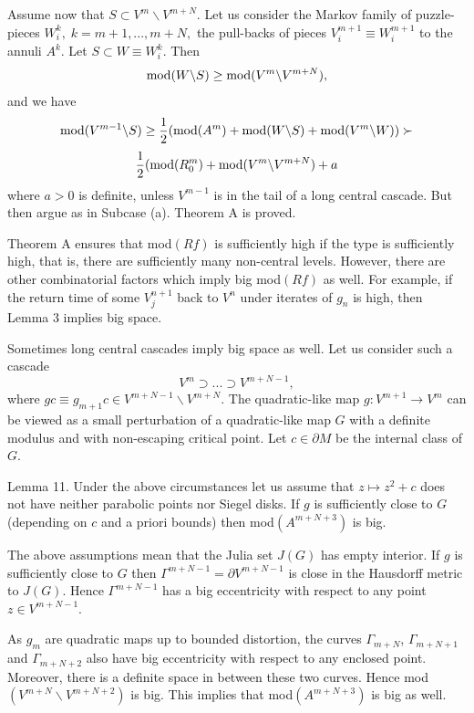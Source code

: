   Assume now that
   $S\subset V^m\backslash V^{m+N}.$  Let us consider the
  Markov family of puzzle-pieces $W^k_i,\; k=m+1,...,m+N,$ the pull-backs
  of pieces $V^{m+1}_i\equiv W^{m+1}_i$ to the annuli $A^k$. 
  Let $S\subset W\equiv W^k_i$. Then
$${\rm mod }(W\backslash S)\geq {\rm mod}(V^m\backslash V^{m+N}),$$
  and  we have
  $${\rm mod} (V^{m-1}\backslash S)\geq
 {1\over 2} ({\rm mod}(A^m)+{\rm mod}(W\backslash S)+
  {\rm mod}(V^m\backslash W))\succ$$
$${1\over 2} ({\rm mod}(R^m_0)+{\rm mod}(V^m\backslash V^{m+N})+a$$
where $a>0$ is definite, unless $V^{m-1}$ is in the tail of
 a long central cascade. But then argue as in Subcase (a).
Theorem A is proved.

\medskip{}
Theorem A ensures that mod$(Rf)$ is sufficiently high if the type 
is sufficiently high, that is, there are 
sufficiently many non-central levels. However, there are other
combinatorial factors which imply big mod$(Rf)$ as well.
For example, if the return time of some $V^{n+1}_j$ back to
$V^n$  under iterates of $g_n$ is high, then Lemma 3 implies big space.

Sometimes long central cascades imply big space as well. 
Let us  consider such a cascade 
$$ V^{m}\supset...\supset V^{m+N-1},$$ 
where $gc\equiv g_{m+1} c\in V^{m+N-1}\backslash V^{m+N}$. 
The quadratic-like map $ g: V^{m+1}\rightarrow V^m$ can be viewed as
a small perturbation of a quadratic-like map $G$ with a definite modulus
and with non-escaping
critical point. Let $c\in \partial M$ be the internal class of $G$.

\proclaim Lemma 11. Under the above circumstances let us assume that
$z\mapsto z^2+c$ does not have neither parabolic points nor Siegel disks.
If $g$ is sufficiently close to $G$ (depending on $c$ and a priori bounds)
then mod$(A^{m+N+3})$ is big.

 The above assumptions mean that the Julia set
$J(G)$ has empty
interior.  If $g$ is sufficiently close to $G$ 
then  $\Gamma^{m+N-1}=\partial V^{m+N-1}$
is close in the Hausdorff metric to $J(G)$.
Hence  $\Gamma^{m+N-1}$ has a big eccentricity with respect to any point
$z\in V^{m+N-1}$.

As $g_m$ are quadratic maps up to bounded distortion, the curves
$\Gamma_{m+N}$, $\Gamma_{m+N+1}$ and $\Gamma_{m+N+2}$ also have big eccentricity
with respect to any enclosed point. Moreover, there is a definite
space in between these two curves. Hence mod$(V^{m+N}\backslash V^{m+N+2})$
is big. This implies that mod$(A^{m+N+3})$ is big as well.

